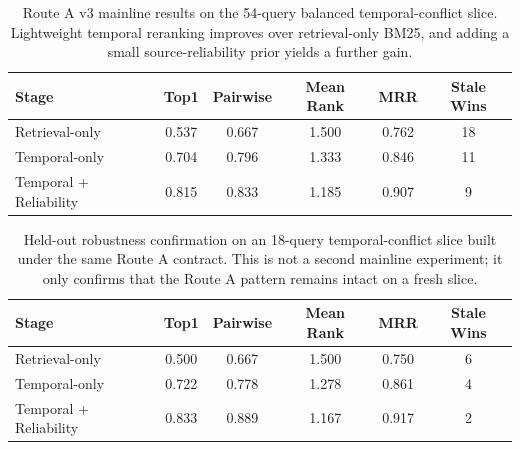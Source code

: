 \begin{table}[t]
\centering
\small
\begin{tabular}{lccccc}
\hline
Stage & Top1 & Pairwise & Mean Rank & MRR & Stale Wins \\
\hline
Retrieval-only & 0.537 & 0.667 & 1.500 & 0.762 & 18 \\
Temporal-only & 0.704 & 0.796 & 1.333 & 0.846 & 11 \\
Temporal + Reliability & 0.815 & 0.833 & 1.185 & 0.907 & 9 \\
\hline
\end{tabular}
\caption{Route A v3 mainline results on the 54-query balanced temporal-conflict slice. Lightweight temporal reranking improves over retrieval-only BM25, and adding a small source-reliability prior yields a further gain.}
\label{tab:route_a_mainline}
\end{table}

\begin{table}[t]
\centering
\small
\begin{tabular}{lccccc}
\hline
Stage & Top1 & Pairwise & Mean Rank & MRR & Stale Wins \\
\hline
Retrieval-only & 0.500 & 0.667 & 1.500 & 0.750 & 6 \\
Temporal-only & 0.722 & 0.778 & 1.278 & 0.861 & 4 \\
Temporal + Reliability & 0.833 & 0.889 & 1.167 & 0.917 & 2 \\
\hline
\end{tabular}
\caption{Held-out robustness confirmation on an 18-query temporal-conflict slice built under the same Route A contract. This is not a second mainline experiment; it only confirms that the Route A pattern remains intact on a fresh slice.}
\label{tab:route_a_holdout}
\end{table}

